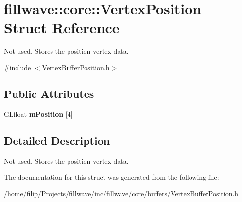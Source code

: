 \hypertarget{structfillwave_1_1core_1_1VertexPosition}{}\section{fillwave\+:\+:core\+:\+:Vertex\+Position Struct Reference}
\label{structfillwave_1_1core_1_1VertexPosition}


Not used. Stores the position vertex data.  




{\ttfamily \#include $<$Vertex\+Buffer\+Position.\+h$>$}

\subsection*{Public Attributes}
\begin{DoxyCompactItemize}
\item 
\hypertarget{structfillwave_1_1core_1_1VertexPosition_a0fd2b86e3fa70d9be531c88fb651d993}{}G\+Lfloat {\bfseries m\+Position} \mbox{[}4\mbox{]}\label{structfillwave_1_1core_1_1VertexPosition_a0fd2b86e3fa70d9be531c88fb651d993}

\end{DoxyCompactItemize}


\subsection{Detailed Description}
Not used. Stores the position vertex data. 

The documentation for this struct was generated from the following file\+:\begin{DoxyCompactItemize}
\item 
/home/filip/\+Projects/fillwave/inc/fillwave/core/buffers/Vertex\+Buffer\+Position.\+h\end{DoxyCompactItemize}
